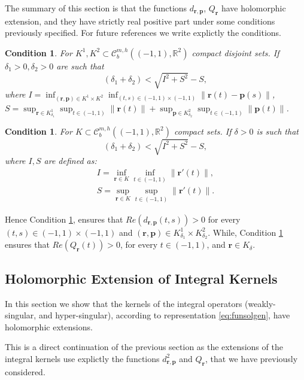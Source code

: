 \documentclass{article}
\newtheorem{condition}[theorem]{Condition}
\newcommand{\IR}{{\mathbb R}}
\newcommand{\bp}{{\bm p}}
\newcommand{\rgeoh}[2]{\mathcal{C}_b^{#1,#2}\left( (-1,1), \IR^2 \right)}
\newcommand{\br}{\bm{r}}
\newcommand{\iinterv}{(-1,1)\times(-1,1)}
\begin{document}
The summary of this section is that the functions $d_{\br,\bp}$, $Q_{\br}$ have holomorphic extension, and they have strictly real positive part under some conditions previously specified. For future references we write explictly the conditions.

\begin{condition}
\label{condition:dcross}
For $K^1,K^2 \subset \rgeoh{m}{h}$ compact disjoint sets. If $\delta_1>0,\delta_2>0$ are such that 
$$
(\delta_1 + \delta_2) < \sqrt{I^2+S^2}-S,
$$
where $I=\inf_{(\br,\bp) \in K^1 \times K^2} \inf_{(t,s) \in (-1,1)\times(-1,1)}
 \| \br(t) - \bp(s) \|$, $S = \sup_{\br \in K^1_{\delta_1}} \sup_{t \in (-1,1)} \| \br(t)\| +
\sup_{\bp \in K^2_{\delta_2}} \sup_{t \in (-1,1)} \| \bp(t)\|$. 
\end{condition}

\begin{condition}
\label{condition:Qself}
For $K \subset \rgeoh{m}{h}$ compact  sets. If $\delta>0 $ is such that 
$$
(\delta_1 + \delta_2) < \sqrt{I^2+S^2}-S,
$$
where $I,S$ are defined as:
\begin{align*}
 I = \inf_{\br \in K} \inf_{t \in (-1,1)} \| \br'(t)\|,\\
 S = \sup_{\br \in K} \sup_{t \in (-1,1)} \|\br'(t)\|.
\end{align*} 
\end{condition}
Hence Condition \ref{condition:dcross}, ensures that $Re(d_{\br,\bp}(t,s))>0$ for every $(t,s) \in \iinterv$ and $(\br,\bp) \in K^1_{\delta_1} \times K^2_{\delta_2}$. While, Condition \ref{condition:Qself} ensures that $Re(Q_{\br}(t)) >0$, for every $t \in (-1,1)$, and $\br \in K_\delta$. 

\subsection{Holomorphic Extension of Integral Kernels}
\label{sec:hlrmfsextIKernel}
In this section we show that the kernels of the integral operators (weakly-singular, and hyper-singular), according to representation \eqref{eq:funsolgen}, have holomorphic extensions. 

This is a direct continuation of the previous section as the extensions of the integral kernels use explictly the functions $d_{\br,\bp}^2$ and $Q_{\br}$, that we have previously considered.
\end{document}
